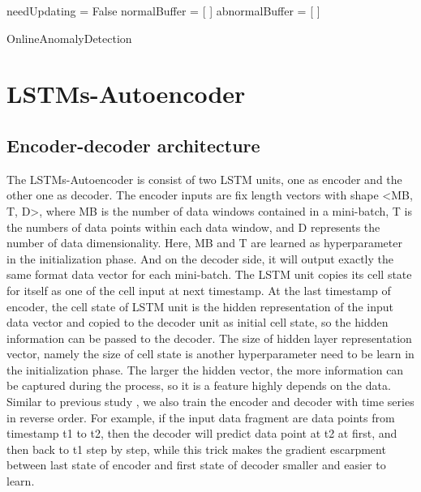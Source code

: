 \begin{algorithm}[h]

\BlankLine 
needUpdating = False\;
normalBuffer = [ ]\;
abnormalBuffer = [ ]\;
\BlankLine 

 \caption{OnlineAnomalyDetection}
\label{alg:pipeline}
\end{algorithm}



\section{LSTMs-Autoencoder}
\label{sec:initialization}

\subsection{Encoder-decoder architecture}
\label{sec:Encoder-decoder architecture}

The LSTMs-Autoencoder is consist of two LSTM units, one as encoder and the other one as decoder. The encoder inputs are fix length vectors with shape <MB, T, D>, where MB is the number of data windows contained in a mini-batch, T is the numbers of data points within each data window, and D represents the number of data dimensionality. Here, MB and T are learned as hyperparameter in the initialization phase. And on the decoder side, it will output exactly the same format data vector for each mini-batch. The LSTM unit copies its cell state for itself as one of the cell input at next timestamp. At the last timestamp of encoder, the cell state of LSTM unit is the hidden representation of the input data vector and copied to the decoder unit as initial cell state, so the hidden information can be passed to the decoder. The size of hidden layer representation vector, namely the size of cell state is another hyperparameter need to be learn in the initialization phase. The larger the hidden vector, the more information can be captured during the process, so it is a feature highly depends on the data. Similar to previous study \cite{seq2seq}, we also train the encoder and decoder with time series in reverse order. For example, if the input data fragment are data points from timestamp t1 to t2, then the decoder will predict data point at t2 at first, and then back to t1 step by step, while this trick makes the gradient escarpment between last state of encoder and first state of decoder smaller and easier to learn. \\

